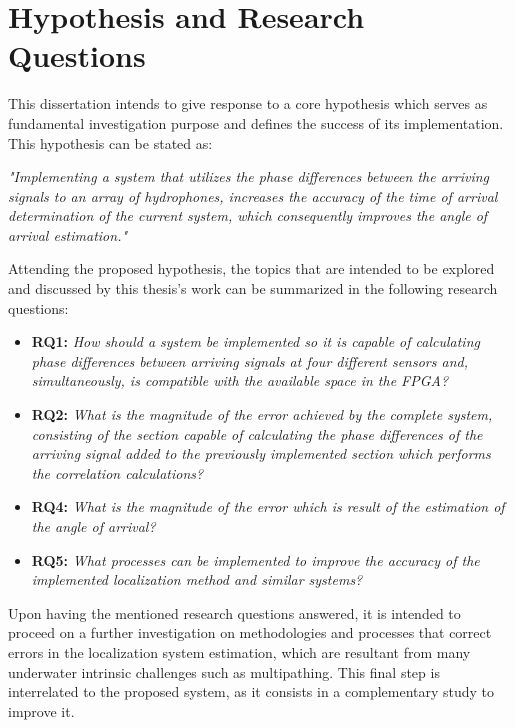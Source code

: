 \section{Hypothesis and Research Questions}

This dissertation intends to give response to a core hypothesis which serves as fundamental investigation purpose and defines the success of its implementation. This hypothesis can be stated as:

\textit{"Implementing a system that utilizes the phase differences between the arriving signals to an array of hydrophones, increases the accuracy of the time of arrival determination of the current system, which consequently improves the angle of arrival estimation."}


Attending the proposed hypothesis, the topics that are intended to be explored and discussed by this thesis's work can be summarized in the following research questions:

\begin{itemize}
	\item \textbf{RQ1: }\textit{How should a system be implemented so it is capable of calculating phase differences between arriving signals at four different sensors and, simultaneously, is compatible with the available space in the FPGA?}
	
	\item \textbf{RQ2: }\textit{What is the magnitude of the error achieved by the complete system, consisting of the section capable of calculating the phase differences of the arriving signal added to the previously implemented section which performs the correlation calculations?}
	
	\item \textbf{RQ4: }\textit{What is the magnitude of the error which is result of the estimation of the angle of arrival?}
	
	\item \textbf{RQ5: }\textit{What processes can be implemented to improve the accuracy of the implemented localization method and similar systems?}
	
\end{itemize}

Upon having the mentioned research questions answered, it is intended to proceed on a further investigation on methodologies and processes that correct errors in the localization system estimation, which are resultant from many underwater intrinsic challenges such as multipathing. This final step is interrelated to the proposed system, as it consists in a complementary study to improve it.

